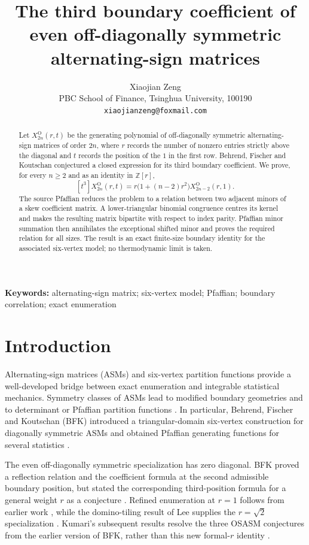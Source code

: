 \documentclass[11pt]{article}
\title{The third boundary coefficient of even off-diagonally symmetric
alternating-sign matrices}
\author{Xiaojian Zeng\\
\small PBC School of Finance, Tsinghua University, 100190\\
\small \texttt{xiaojianzeng@foxmail.com}}
\date{}
\newcommand{\Z}{\mathbb{Z}}
\begin{document}
\maketitle

\begin{abstract}
Let \(X^{\mathrm O}_{2n}(r,t)\) be the generating polynomial of
off-diagonally symmetric alternating-sign matrices of order \(2n\), where
\(r\) records the number of nonzero entries strictly above the diagonal and
\(t\) records the position of the \(1\) in the first row.  Behrend, Fischer
and Koutschan conjectured a closed expression for its third boundary
coefficient.  We prove, for every \(n\geq 2\) and as an identity in
\(\Z[r]\),
\[
 [t^3]X^{\mathrm O}_{2n}(r,t)
 =r\bigl(1+(n-2)r^2\bigr)X^{\mathrm O}_{2n-2}(r,1).
\]
The source Pfaffian reduces the problem to a relation between two adjacent
minors of a skew coefficient matrix.  A lower-triangular binomial
congruence centres its kernel and makes the resulting matrix bipartite with
respect to index parity.  Pfaffian minor summation then annihilates the
exceptional shifted minor and proves the required relation for all sizes.
The result is an exact finite-size boundary identity for the associated
six-vertex model; no thermodynamic limit is taken.
\end{abstract}

\noindent\textbf{Keywords:} alternating-sign matrix; six-vertex model;
Pfaffian; boundary correlation; exact enumeration

\section{Introduction}

Alternating-sign matrices (ASMs) and six-vertex partition functions provide
a well-developed bridge between exact enumeration and integrable statistical
mechanics.  Symmetry classes of ASMs lead to modified boundary geometries and
to determinant or Pfaffian partition functions
\cite{Kuperberg2002,RazumovStroganov2004}.  In particular, Behrend, Fischer
and Koutschan (BFK) introduced a triangular-domain six-vertex construction
for diagonally symmetric ASMs and obtained Pfaffian generating functions for
several statistics \cite{BFK2026}.

The even off-diagonally symmetric specialization has zero diagonal.  BFK
proved a reflection relation and the coefficient formula at the second
admissible boundary position, but stated the corresponding third-position
formula for a general weight \(r\) as a conjecture
\cite[Eq.~(8.33)]{BFK2026}.  Refined enumeration at \(r=1\) follows from
earlier work \cite{RazumovStroganov2004}, while the domino-tiling result of
Lee supplies the \(r=\sqrt 2\) specialization
\cite{Lee2024,BFK2026}.  Kumari's subsequent results resolve the three
OSASM conjectures from the earlier version of BFK, rather than this new
formal-\(r\) identity \cite{Kumari2026,BFK2026}.
\end{document}
